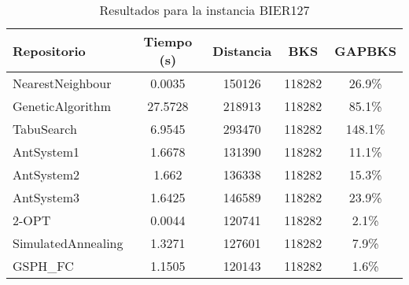 \begin{table}[H]
\centering
\caption{Resultados para la instancia BIER127}
\begin{tabular}{|l|c|c|c|c|}
\hline
\textbf{Repositorio} & \textbf{Tiempo (s)} & \textbf{Distancia} & \textbf{BKS} & \textbf{GAPBKS} \\ 
\hline
NearestNeighbour & 0.0035 & 150126 & 118282 & 26.9\% \\ 
GeneticAlgorithm & 27.5728 & 218913 & 118282 & 85.1\% \\ 
TabuSearch & 6.9545 & 293470 & 118282 & 148.1\% \\ 
AntSystem1 & 1.6678 & 131390 & 118282 & 11.1\% \\ 
AntSystem2 & 1.662 & 136338 & 118282 & 15.3\% \\ 
AntSystem3 & 1.6425 & 146589 & 118282 & 23.9\% \\ 
2-OPT & 0.0044 & 120741 & 118282 & 2.1\% \\ 
SimulatedAnnealing & 1.3271 & 127601 & 118282 & 7.9\% \\ 
GSPH_FC & 1.1505 & 120143 & 118282 & 1.6\% \\ 
\hline
\end{tabular}
\end{table}
